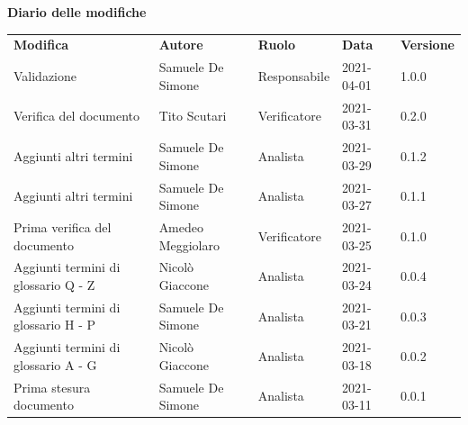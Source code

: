 \documentclass[a4paper]{article}
\begin{document}
\begin{center}
    \textbf{\Large Diario delle modifiche}\\
    \vspace{10px}
    \begin{table}[h!]
        \centering
        \renewcommand{\arraystretch}{1.8}
        \begin{tabular}{p{150px} p{90px} p{60px} p{60px} p{45px}}
            \rowcolor{logo!70} \textbf{Modifica} & \textbf{Autore}   & \textbf{Ruolo} & \textbf{Data} & \textbf{Versione} \\
            Validazione                          & Samuele De Simone & Responsabile   & 2021-04-01    & 1.0.0             \\
            Verifica del documento               & Tito Scutari      & Verificatore   & 2021-03-31    & 0.2.0             \\
            Aggiunti altri termini               & Samuele De Simone & Analista       & 2021-03-29    & 0.1.2             \\
            Aggiunti altri termini               & Samuele De Simone & Analista       & 2021-03-27    & 0.1.1             \\
            Prima verifica del documento         & Amedeo Meggiolaro & Verificatore   & 2021-03-25    & 0.1.0             \\
            Aggiunti termini di glossario Q - Z  & Nicolò Giaccone   & Analista       & 2021-03-24    & 0.0.4             \\
            Aggiunti termini di glossario H - P  & Samuele De Simone & Analista       & 2021-03-21    & 0.0.3             \\
            Aggiunti termini di glossario A - G  & Nicolò Giaccone   & Analista       & 2021-03-18    & 0.0.2             \\
            Prima stesura documento              & Samuele De Simone & Analista       & 2021-03-11    & 0.0.1             \\
        \end{tabular}
    \end{table}
\end{center}

\newpage
\tableofcontents
\newpage
\appendix


























\end{document}
